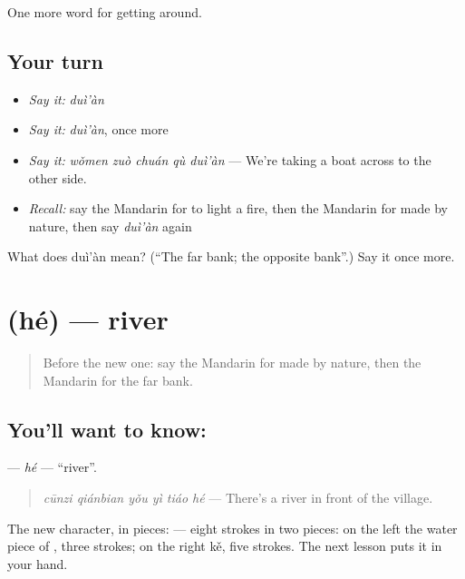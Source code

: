 \begin{grammarlens}[title={What you've built}]
One more word for getting around.
\end{grammarlens}

\subsection*{Your turn}
\begin{itemize}
\raggedright
  \item \emph{Say it:} \emph{duì'àn}
  \item \emph{Say it:} \emph{duì'àn}, once more
  \item \emph{Say it:} \emph{wǒmen zuò chuán qù duì'àn} — We're taking a boat across to the other side.
  \item \emph{Recall:} say the Mandarin for to light a fire, then the Mandarin for made by nature, then say \emph{duì'àn} again
\end{itemize}

\begin{tcolorbox}[breakable,colback=teal!4,colframe=teal!35!black,title={Before you move on}]
What does duì'àn mean? (\textquotedblleft{}The far bank; the opposite bank\textquotedblright{}.) Say it once more.
\end{tcolorbox}
\section[\texorpdfstring{\zh{河} (hé)}{河 (hé)}]{ (hé) — river}

\label{lesson:ZH-C442-he}



\begin{quote}
Before the new one: say the Mandarin for made by nature, then the Mandarin for the far bank.
\end{quote}

\subsection*{You'll want to know: }
\textbf{} — \emph{hé} — \textquotedblleft{}river\textquotedblright{}.

\begin{quote}
\emph{cūnzi qiánbian yǒu yì tiáo hé} — There's a river in front of the village.
\end{quote}

The new character, in pieces:  — eight strokes in two pieces: on the left the water piece of , three strokes; on the right  kě, five strokes. The next lesson puts it in your hand.

